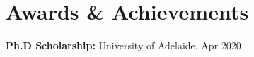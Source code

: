\documentclass[letterpaper,11pt]{article}
\newcommand{\resumeSubHeadingListStart}{\begin{itemize}[leftmargin=0.15in, label={}]}
\newcommand{\resumeSubHeadingListEnd}{\end{itemize}}
\begin{document}
\section{Awards \& Achievements}
  \vspace{2pt}
  \resumeSubHeadingListStart
    \small{\item{
        \textbf{Ph.D Scholarship: }{University of Adelaide, Apr 2020} \\ \vspace{3pt}

    
        
        
        
        
        
    }}
  \resumeSubHeadingListEnd
\end{document}
